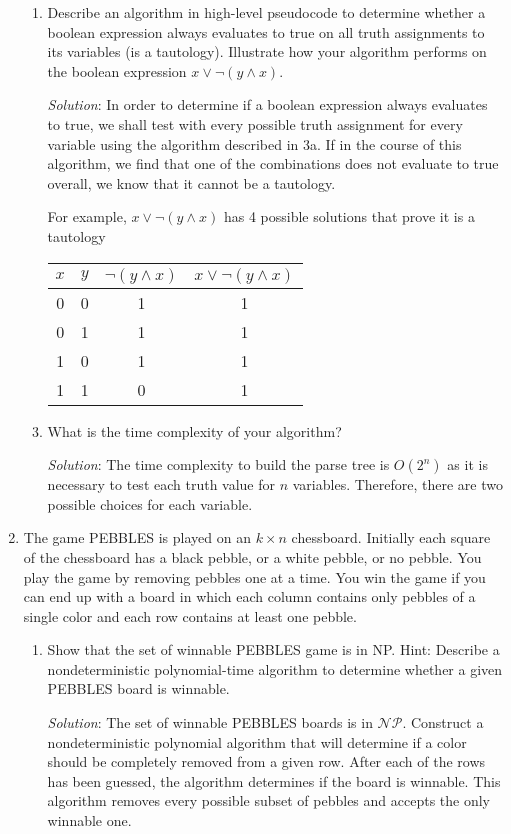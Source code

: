 \documentclass[]{article}
\begin{document}
\begin{enumerate}
\begin{enumerate}
\item Describe an algorithm in high-level pseudocode to determine whether a
boolean expression always evaluates to true on all truth assignments to its
variables (is a tautology). Illustrate how your algorithm performs on the
boolean expression $x \vee \neg (y \wedge x)$.
\item[\emph{Solution}:] In order to determine if a boolean expression always
evaluates to true, we shall test with every possible truth assignment for every
variable using the algorithm described in 3a. If in the course of this
algorithm, we find that one of the combinations does not evaluate to true
overall, we know that it cannot be a tautology.

For example, $x \vee \neg(y \wedge x)$ has 4 possible solutions that prove it is
a tautology \\
\begin{tabular}{|c|c|c|c|}
\hline
$x$ & $y$ & $\neg(y\wedge x)$ & $x \vee \neg(y \wedge x)$ \\ \hline
0   & 0   & 1                 & 1                         \\ \hline
0   & 1   & 1                 & 1                         \\ \hline
1   & 0   & 1                 & 1                         \\ \hline
1   & 1   & 0                 & 1                         \\ \hline
\end{tabular}

\item What is the time complexity of your algorithm?
\item[\emph{Solution}:] The time complexity to build the parse tree is $O(2^n)$
as
it is necessary to test each truth value for $n$ variables. Therefore, there are
two possible choices for each variable.

\end{enumerate}

\item The game PEBBLES is played on an $k \times n$ chessboard. Initially each
square of the chessboard has a black pebble, or a white pebble, or no pebble.
You play the game by removing pebbles one at a time. You win the game if you can
end up with a board in which each column contains only pebbles of a single color
and each row contains at least one pebble.
\begin{enumerate}
\item Show that the set of winnable PEBBLES game is in NP. Hint: Describe a
nondeterministic polynomial-time algorithm to  determine whether a given PEBBLES
board is winnable.
\item[\emph{Solution}:] The set of winnable PEBBLES boards is in $\mathcal{NP}$.
Construct a nondeterministic polynomial algorithm that will determine if
a color should be completely removed from a given row. After each of the rows
has been guessed, the algorithm determines if the board is winnable. This
algorithm removes every possible subset of pebbles and accepts the only winnable
one.


\end{enumerate}
\end{enumerate}
\end{document}
